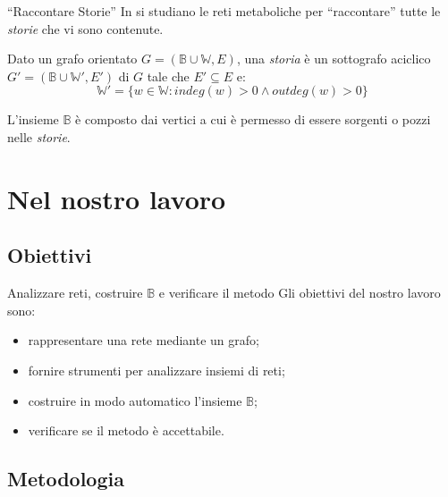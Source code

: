 \documentclass{beamer}
\begin{document}
\begin{frame}{``Raccontare Storie''}
In \cite{Crescenzi-Marino} si studiano le reti metaboliche per
``raccontare'' tutte le \emph{storie} che vi sono contenute.
\begin{definition}
  Dato un grafo orientato $G = (\mathbb{B} \cup \mathbb{W}, E)$, una
  \emph{storia} \`e un sottografo aciclico $G' = (\mathbb{B} \cup
  \mathbb{W'}, E')$ di $G$ tale che $E' \subseteq E $ e:
  \begin{displaymath}
    \mathbb{W'} = \{w \in \mathbb{W}: indeg(w) > 0 \wedge outdeg(w)
    > 0\}
  \end{displaymath}
\end{definition}
L'insieme $\mathbb{B}$ \`e composto dai vertici a cui \`e permesso di
essere sorgenti o pozzi nelle \emph{storie}.
\end{frame}

\section{Nel nostro lavoro}

\subsection{Obiettivi}

\begin{frame}{Analizzare reti, costruire $\mathbb{B}$ e verificare il
    metodo}
Gli obiettivi del nostro lavoro sono:
\begin{itemize}
\item<1-> rappresentare una rete mediante un grafo;
\item<2-> fornire strumenti per analizzare insiemi di reti;
\item<3-> costruire in modo automatico l'insieme $\mathbb{B}$;
\item<4-> verificare se il metodo \`e accettabile.
\end{itemize}
\end{frame}

\subsection{Metodologia}
\end{document}
